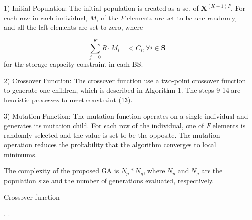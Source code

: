 \documentclass[conference]{IEEEtran}
\begin{document}
1)	Initial Population: The initial population is created as a set of $\mathbf{X}^{(K+1)F}$. For each row in each individual, $M_i$ of the $F$ elements are set to be one randomly, and all the left elements are set to zero, where

\begin{equation}
\sum_{j=0}^K B\cdot M_i \quad<C_i, \forall{i}\in\mathbf{S}
\end{equation}
for the storage capacity constraint in each BS.

2)	Crossover Function: The crossover function use a two-point crossover function to generate one children, which is described in Algorithm 1. The steps 9-14 are heuristic processes to meet constraint (13).

3)	Mutation Function: The mutation function operates on a single individual and generates its mutation child. For each row of the individual, one of $F$ elements is randomly selected and the value is set to be the opposite. The mutation operation reduces the probability that the algorithm converges to local minimums.

The complexity of the proposed GA is $N_p\ast N_g$, where $ N_p$ and $N_g$ are the population size and the number of generations evaluated, respectively.

\begin{algorithm}[htb]
 \caption{Crossover function}
 \label{alg:admission}
 \begin{algorithmic}[1] %
  \ELSE
  \ENDIF
{}
.
\ENDWHILE
{}
.
\ENDWHILE
  \ENDFOR
 \end{algorithmic}
\end{algorithm}
\end{document}
